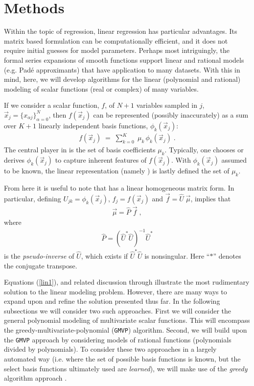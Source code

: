 \documentclass[twocolumn,aps,prd,floatfix,preprintnumbers,a4paper,nofootinbib,
superscriptaddress,10pt]{revtex4-1}
\def\gmvp#1{greedy-multivariate-polynomial#1
  (\texttt{GMVP}#1)\gdef\gmvp{\texttt{GMVP}}}
\begin{document}
\section{Methods}
\label{meth}
%
Within the topic of regression, linear regression has particular advantages.
%
Its matrix based formulation can be computationally efficient, and it does not require initial guesses for model parameters.
%
Perhaps most intriguingly, the formal series expansions of smooth functions support linear and rational models (e.g. Pad\'e approximants) that have application to many datasets.
%
With this in mind, here, we will develop algorithms for the linear (polynomial and rational) modeling of scalar functions (real or complex) of many variables.
%
\par If we consider a scalar function, $f$, of $N+1$ variables sampled in $j$, $\vec{x}_j = \{x_{\alpha j}\}_{\alpha=0}^{N}$, then $f(\vec{x}_j)$ can be represented (possibly inaccurately) as a sum over $K+1$ linearly independent basis functions, $\phi_k(\vec{x}_j)$:
%
\begin{align}
  \label{lin1}
  f({\vec{x}}_j) \; = \; \sum_{k=0}^{K} \; \mu_{k} \, \phi_k(\vec{x}_j)\; .
\end{align}
%
The central player in  is the set of basis coefficients $\mu_{k}$.
%
Typically, one chooses or derives $\phi_{k}(\vec{x}_j)$ to capture inherent features of $f(\vec{x}_j)$.
%
With $\phi_{k}(\vec{x}_j)$ assumed to be known, the linear representation (namely ) is lastly defined the set of $\mu_k$.
%
\def\vecmu{\vec{\mu}}
\def\vecf{\vec{f}}
\def\hatU{\hat{U}}
\def\hatP{\hat{P}}
%
\par From here it is useful to note that  has a linear homogeneous matrix form.
%
In particular, defining ${U}_{jk} = \phi_k(\vec{x}_j)$, $f_j = f(\vec{x}_j)$ and $\vec{f} = \hat{U} \; \vec{\mu}$, implies that
%
\begin{align}
  \label{eq:linsol1}
  \vecmu = \hatP \; \vecf \; ,
\end{align}
%
where
%
\begin{align}
  \label{pinv1}
  \hatP = \left( \hatU^{*} \hatU \right)^{-1}\hatU^{*}
\end{align}
%
is the \textit{pseudo-inverse} \cite{Moore1920,Penrose:1955} of $\hatU$, which exists if $\hatU^{*} \hatU$ is nonsingular.
%
Here ``$*$'' denotes the conjugate transpose.
%
\par Equations (\ref{lin1}), and related discussion through  illustrate the most rudimentary solution to the linear modeling problem.
%
However, there are many ways to expand upon and refine the solution presented thus far.
%
In the following subsections we will consider two such approaches.
%
First we will consider the general polynomial modeling of multivariate scalar functions.
%
This will encompass the \gmvp{} algorithm.
%
Second, we will build upon the \gmvp{} approach by considering models of rational functions (polynomials divided by polynomials).
%
To consider these two approaches in a largely automated way (i.e. where the set of possible basis functions is known, but the select basis functions ultimately used are \textit{learned}), we will make use of the \textit{greedy} algorithm approach \cite{Field:2011mf, GVK022791892, 1978AnSta, Pandit84}.
%
\end{document}
